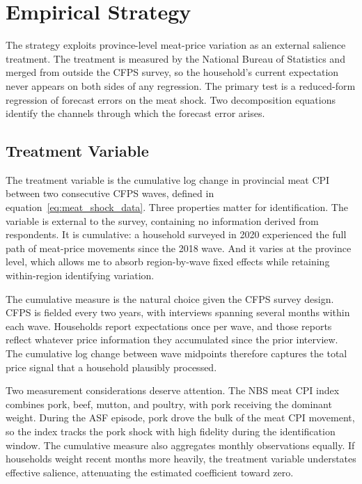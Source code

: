 \section{Empirical Strategy}\label{sec:strategy}

The strategy exploits province-level meat-price variation as an
external salience treatment.
The treatment is measured by the National Bureau of Statistics
and merged from outside the CFPS survey, so the household's
current expectation never appears on both sides of any
regression.
The primary test is a reduced-form regression of forecast errors
on the meat shock.
Two decomposition equations identify the channels through which
the forecast error arises.

\subsection{Treatment Variable}\label{sec:meatshock}

The treatment variable is the cumulative log change in provincial
meat CPI between two consecutive CFPS waves, defined in
equation~\eqref{eq:meat_shock_data}.
Three properties matter for identification.
The variable is external to the survey, containing no
information derived from respondents.
It is cumulative: a household surveyed in 2020 experienced the
full path of meat-price movements since the 2018 wave.
And it varies at the province level, which allows me to absorb
region-by-wave fixed effects while retaining within-region
identifying variation.

The cumulative measure is the natural choice given the CFPS
survey design.
CFPS is fielded every two years, with interviews spanning
several months within each wave.
Households report expectations once per wave, and those reports
reflect whatever price information they accumulated since the
prior interview.
The cumulative log change between wave midpoints therefore
captures the total price signal that a household plausibly
processed.

Two measurement considerations deserve attention.
The NBS meat CPI index combines pork, beef, mutton, and
poultry, with pork receiving the dominant weight.
During the ASF episode, pork drove the bulk of the meat CPI
movement, so the index tracks the pork shock with high fidelity
during the identification window.
The cumulative measure also aggregates monthly observations
equally.
If households weight recent months more heavily, the treatment
variable understates effective salience, attenuating the
estimated coefficient toward zero.

